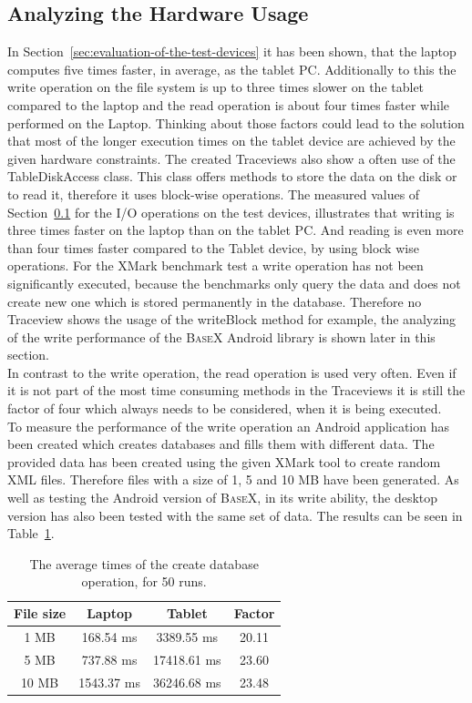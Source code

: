 \newpage
\subsection{Analyzing the Hardware Usage}
\label{sec:analyzing-the-hardware-usage}
In Section~\ref{sec:evaluation-of-the-test-devices} it has been shown, that the laptop computes five times faster, in average, as the tablet PC.
Additionally to this the write operation on the file system is up to three times slower on the tablet compared to the laptop and the read operation is about four times faster while performed on the Laptop.
Thinking about those factors could lead to the solution that most of the longer execution times on the tablet device are achieved by the given hardware constraints.
The created Traceviews also show a often use of the \textsf{TableDiskAccess} class.
This class offers methods to store the data on the disk or to read it, therefore it uses block-wise operations.
The measured values of Section~\ref{sec:analyzing-the-hardware-usage} for the I/O operations on the test devices, illustrates that writing is three times faster on the laptop than on the tablet PC.
And reading is even more than four times faster compared to the Tablet device, by using block wise operations.
For the XMark benchmark test a write operation has not been significantly executed, because the benchmarks only query the data and does not create new one which is stored permanently in the database.
Therefore no Traceview shows the usage of the \textsf{writeBlock} method for example, the analyzing of the write performance of the \textsc{BaseX} Android library is shown later in this section.\\
In contrast to the write operation, the read operation is used very often.
Even if it is not part of the most time consuming methods in the Traceviews it is still the factor of four which always needs to be considered, when it is being executed.\\
To measure the performance of the write operation an Android application has been created which creates databases and fills them with different data.
The provided data has been created using the given XMark tool to create random XML files.
Therefore files with a size of 1, 5 and 10 MB have been generated.
As well as testing the Android version of \textsc{BaseX}, in its write ability, the desktop version has also been tested with the same set of data.
The results can be seen in Table~\ref{tab:average-times-create-db}.
\begin{table}[htpb]
	\centering
	\begin{tabular}{|c|c|c||c|}
		\hline
		File size&Laptop&Tablet&Factor\\
		\hline
		1 MB&168.54 ms&3389.55 ms&20.11\\
		\hline
		5 MB&737.88 ms&17418.61 ms&23.60\\
		\hline
		10 MB&1543.37 ms&36246.68 ms&23.48\\
		\hline
	\end{tabular}
	\caption{The average times of the create database operation, for 50 runs.}
	\label{tab:average-times-create-db}
\end{table}

